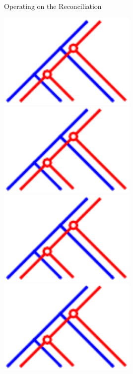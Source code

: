 \documentclass{beamer}
\begin{document}
\begin{frame}{Operating on the Reconciliation}
\vfil
\begin{overprint}
\centering\includegraphics[page=1,width=0.5\textwidth]{figures/operator/operator-pics.pdf}
\centering\includegraphics[page=2,width=0.5\textwidth]{figures/operator/operator-pics.pdf}
\centering\includegraphics[page=3,width=0.5\textwidth]{figures/operator/operator-pics.pdf}
\centering\includegraphics[page=4,width=0.5\textwidth]{figures/operator/operator-pics.pdf}
\end{overprint}
\vfil


\end{frame}
\end{document}
